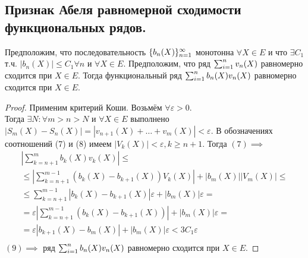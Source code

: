 \documentclass[main]{subfiles}
\begin{document}
\subsection{Признак Абеля равномерной сходимости функциональных рядов.}
\begin{theorem}
     Предположим, что последовательность $\fnn[b_n(X)]$ монотонна $\forall X\in E$ 
     и что $\exists C_1$ т.ч. $|b_n(X)|\leq C_1 \forall n$ и $\forall X\in E.$ 
     Предположим, что ряд $\sumn v_n(X)$ равномерно сходится при $X\in E.$ 
     Тогда функциональный ряд $\sumn b_n(X)v_n(X)$ равномерно сходится 
     при $X\in E.$ \end{theorem}
\begin{proof}
     Применим критерий Коши. Возьмём $\forall \varepsilon>0.$ \\
      Тогда $\exists N: \forall m>n>N$ и $\forall X\in E$ выполнено
       $|S_m(X)-S_n(X)|=|v_{n+1}(X)+\dots+v_m(X)|<\varepsilon.$ В обозначениях
        соотношений (7) и (8) имеем $|V_k(X)|<\varepsilon, k\geq n+1.$ Тогда $(7) \implies$
       \begin{multline*}
 \left|\sum_{k=n+1}^m b_k(X)v_k(X)\right|\leq  \\ \leq 
 \left|\sum_{k=n+1}^{m-1}(b_k(X)-b_{k+1}(X))V_k(X)\right|+ |b_m(X)||V_m(X)|\leq \\
 \leq \sum_{k=n+1}^{m-1}|b_k(X)-b_{k+1}(X)|\varepsilon + |b_m(X)|\varepsilon =\\ =\varepsilon
  |\sum_{k=n+1}^{m-1}(b_k(X)-b_{k+1}(X))|+|b_m(X)|\varepsilon= \\
 =\varepsilon|b_{k+1}(X)-b_m(X)|+|b_m(X)|\varepsilon<3C_1\varepsilon\tag{9} \\
\end{multline*}
$(9)\implies$ ряд $\sumn b_n(X)v_n(X)$ равномерно сходится при $X\in E.$ \end{proof}
 
\end{document}
